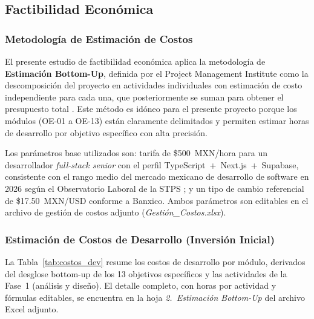 \FloatBarrier
\subsection{Factibilidad Económica}

\subsubsection{Metodología de Estimación de Costos}

El presente estudio de factibilidad econ\'omica aplica la metodolog\'ia de
\textbf{Estimaci\'on Bottom-Up}, definida por el Project Management Institute
como la descomposici\'on del proyecto en actividades individuales con estimaci\'on
de costo independiente para cada una, que posteriormente se suman para obtener
el presupuesto total \cite{stps_observatorio}. Este m\'etodo es id\'oneo para el presente proyecto
porque los m\'odulos (OE-01 a OE-13) est\'an claramente delimitados y permiten
estimar horas de desarrollo por objetivo espec\'ifico con alta precisi\'on.

Los par\'ametros base utilizados son: tarifa de \$500~MXN/hora para un desarrollador
\textit{full-stack senior} con el perfil TypeScript~+~Next.js~+~Supabase, consistente
con el rango medio del mercado mexicano de desarrollo de software en 2026 seg\'un
el Observatorio Laboral de la STPS \cite{stps_observatorio}; y un tipo de cambio referencial de
\$17.50~MXN/USD conforme a Banxico. Ambos par\'ametros son editables en el archivo
de gesti\'on de costos adjunto (\textit{Gesti\'on\_Costos.xlsx}).

\subsubsection{Estimación de Costos de Desarrollo (Inversión Inicial)}

La Tabla~\ref{tab:costos_dev} resume los costos de desarrollo por m\'odulo,
derivados del desglose bottom-up de los 13 objetivos espec\'ificos y las
actividades de la Fase~1 (an\'alisis y dise\~no). El detalle completo, con
horas por actividad y f\'ormulas editables, se encuentra en la hoja
\textit{2.~Estimaci\'on Bottom-Up} del archivo Excel adjunto.

